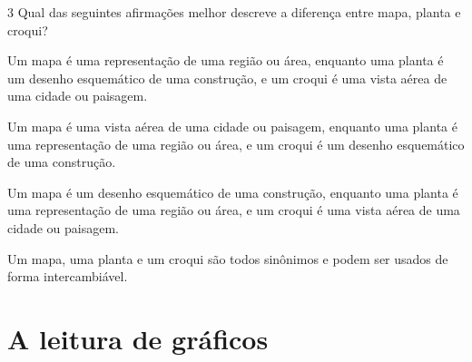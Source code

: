 \num{3}  Qual das seguintes afirmações melhor descreve a diferença entre mapa,
planta e croqui?

\begin{escolha}
\item
  Um mapa é uma representação de uma região ou área, enquanto uma planta
  é um desenho esquemático de uma construção, e um croqui é uma vista
  aérea de uma cidade ou paisagem.
\item
  Um mapa é uma vista aérea de uma cidade ou paisagem, enquanto uma
  planta é uma representação de uma região ou área, e um croqui é um
  desenho esquemático de uma construção.
\item
  Um mapa é um desenho esquemático de uma construção, enquanto uma
  planta é uma representação de uma região ou área, e um croqui é uma
  vista aérea de uma cidade ou paisagem.
\item
  Um mapa, uma planta e um croqui são todos sinônimos e podem ser usados
  de forma intercambiável.
\end{escolha}




\chapter{A leitura de gráficos}

